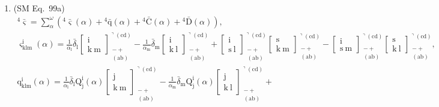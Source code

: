 \documentclass[12pt]{article}
\begin{document}
\begin{enumerate}[label=(\arabic*), series=formellist]
    \item (SM Eq.\ 99a) 
    \[
    \begin{gathered}
    {}^4\bar{\bm{\varsigma}} = \sum_\alpha^\omega \left( {}^4\bar{\bm{\varsigma}}(\alpha) + {}^4\bar{\mathrm{q}}(\alpha) + {}^4\bar{\mathrm{C}}(\alpha) + {}^4\bar{\mathrm{D}}(\alpha) \right), \\
    \varsigma^\mathrm{i}_{\mathrm{klm}}(\alpha) = \frac{1}{\alpha_\mathrm{l}}\bar{\delta}_\mathrm{l} \left[ \begin{smallmatrix} \mathrm{i} \\ \mathrm{k\ m} \end{smallmatrix} \right]^{\urcorner(\mathrm{cd})}_{\substack{- + \\ (\mathrm{ab})}} - \frac{1}{\alpha_\mathrm{m}}\bar{\delta}_\mathrm{m} \left[ \begin{smallmatrix} \mathrm{i} \\ \mathrm{k\ l} \end{smallmatrix} \right]^{\urcorner(\mathrm{cd})}_{\substack{- + \\ (\mathrm{ab})}} + \left[ \begin{smallmatrix} \mathrm{i} \\ \mathrm{s\ l} \end{smallmatrix} \right]^{\urcorner(\mathrm{cd})}_{\substack{- + \\ (\mathrm{ab})}} \left[ \begin{smallmatrix} \mathrm{s} \\ \mathrm{k\ m} \end{smallmatrix} \right]^{\urcorner(\mathrm{cd})}_{\substack{- + \\ (\mathrm{ab})}} - \left[ \begin{smallmatrix} \mathrm{i} \\ \mathrm{s\ m} \end{smallmatrix} \right]^{\urcorner(\mathrm{cd})}_{\substack{- + \\ (\mathrm{ab})}} \left[ \begin{smallmatrix} \mathrm{s} \\ \mathrm{k\ l} \end{smallmatrix} \right]^{\urcorner(\mathrm{cd})}_{\substack{- + \\ (\mathrm{ab})}}, \\
    \mathrm{q}^\mathrm{i}_{\mathrm{klm}}(\alpha) = \frac{1}{\alpha_\mathrm{l}}\bar{\delta}_\mathrm{l} \mathrm{Q}^\mathrm{i}_\mathrm{j}(\alpha) \left[ \begin{smallmatrix} \mathrm{j} \\ \mathrm{k\ m} \end{smallmatrix} \right]^{\urcorner(\mathrm{cd})}_{\substack{- + \\ (\mathrm{ab})}} - \frac{1}{\alpha_\mathrm{m}}\bar{\delta}_\mathrm{m} \mathrm{Q}^\mathrm{i}_\mathrm{j}(\alpha) \left[ \begin{smallmatrix} \mathrm{j} \\ \mathrm{k\ l} \end{smallmatrix} \right]^{\urcorner(\mathrm{cd})}_{\substack{- + \\ (\mathrm{ab})}} + \\

\end{gathered}\]
\end{enumerate}
\end{document}
